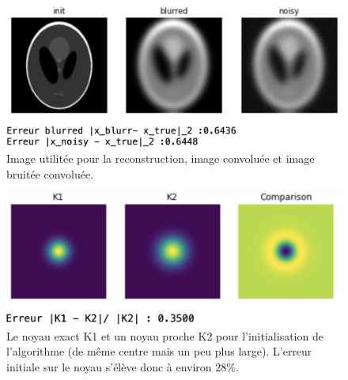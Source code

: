 \documentclass[a4paper]{article}
\begin{document}
%
\begin{figure}[h]
\includegraphics[scale=0.6]{figures/shepp-logan}
\caption{Image utilitée pour la reconstruction, image convoluée et image bruitée convoluée.}
\end{figure}
%
\begin{figure}[h]
\includegraphics[scale=0.6]{figures/kernel}
\caption{Le noyau exact K1 et un noyau proche K2 pour l'initialisation de l'algorithme (de même centre mais un peu plus large).
L'erreur initiale sur le noyau s'élève donc à environ $28\%$.}
\end{figure}
\end{document}
